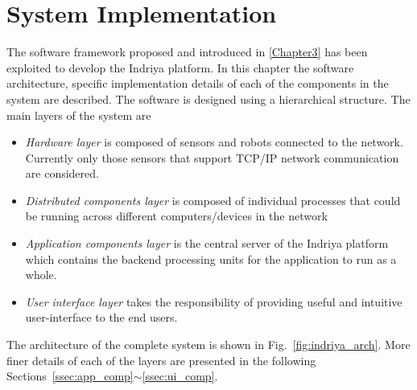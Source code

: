 
\chapter{System Implementation} %

\label{Chapter4} %

The software framework proposed and introduced in \ref{Chapter3} has been exploited to develop the Indriya platform. In this chapter the software architecture, specific implementation details of each of the components in the system are described. The software is designed using a hierarchical structure. The main layers of the system are
\begin{itemize}
\item \emph{Hardware layer} is composed of sensors and robots connected to the network. Currently only those sensors that support TCP/IP network communication are considered.
\item \emph{Distributed components layer} is composed of individual processes that could be running across different computers/devices in the network
\item \emph{Application components layer} is the central server of the Indriya platform which contains the backend processing units for the application to run as a whole.
\item \emph{User interface layer} takes the responsibility of providing useful and intuitive user-interface to the end users.
\end{itemize}
The architecture of the complete system is shown in Fig.~\ref{fig:indriya_arch}. More finer details of each of the layers are presented in the following Sections~\ref{ssec:app_comp}$\sim$\ref{ssec:ui_comp}.
